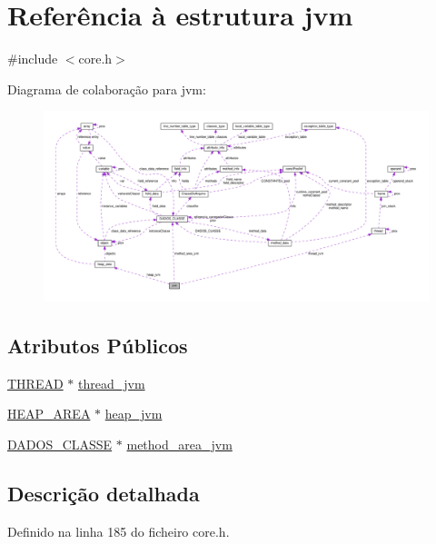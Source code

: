 \hypertarget{structjvm}{\section{Referência à estrutura jvm}
\label{structjvm}
}


{\ttfamily \#include $<$core.\-h$>$}



Diagrama de colaboração para jvm\-:\nopagebreak
\begin{figure}[H]
\begin{center}
\leavevmode
\includegraphics[width=350pt]{structjvm__coll__graph}
\end{center}
\end{figure}
\subsection*{Atributos Públicos}
\begin{DoxyCompactItemize}
\item 
\hyperlink{core_8h_ad43b7ffe97b146f9dce917ae2a0fd181}{T\-H\-R\-E\-A\-D} $\ast$ \hyperlink{structjvm_a95875933adbaab4bef10b00738ba0722}{thread\-\_\-jvm}
\item 
\hyperlink{core_8h_a8aa4d8af3cc19c82a17fa714d533cb8f}{H\-E\-A\-P\-\_\-\-A\-R\-E\-A} $\ast$ \hyperlink{structjvm_aaa2c1b91d2f8feef91b7e1e8552a873f}{heap\-\_\-jvm}
\item 
\hyperlink{struct_d_a_d_o_s___c_l_a_s_s_e}{D\-A\-D\-O\-S\-\_\-\-C\-L\-A\-S\-S\-E} $\ast$ \hyperlink{structjvm_ac8c89a213f0d332aff40faa2661b97e3}{method\-\_\-area\-\_\-jvm}
\end{DoxyCompactItemize}


\subsection{Descrição detalhada}


Definido na linha 185 do ficheiro core.\-h.



